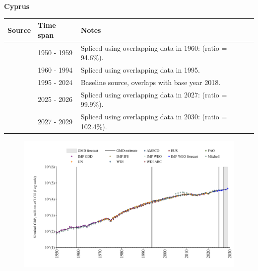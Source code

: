\documentclass[12pt,a4paper,landscape]{article}
\begin{document}
\begin{adjustbox}{max totalsize={\paperwidth}{\paperheight},center}
\begin{minipage}[t][\textheight][t]{\textwidth}
\vspace*{0.5cm}
{}
\begin{center}
{\Large\bfseries Cyprus}
\end{center}
\vspace{0.5cm}
\begin{table}[H]
\centering
\small
\begin{tabular}{|l|l|l|}
\hline
\textbf{Source} & \textbf{Time span} & \textbf{Notes} \\
\hline
\rowcolor{white}\cite{IMF_GDD}& 1950 - 1959 &Spliced using overlapping data in 1960: (ratio = 94.6\%).\\
\rowcolor{lightgray}\cite{AMECO}& 1960 - 1994 &Spliced using overlapping data in 1995.\\
\rowcolor{white}\cite{EUS}& 1995 - 2024 &Baseline source, overlaps with base year 2018.\\
\rowcolor{lightgray}\cite{AMECO}& 2025 - 2026 &Spliced using overlapping data in 2027: (ratio = 99.9\%).\\
\rowcolor{white}\cite{IMF_WEO_forecast}& 2027 - 2029 &Spliced using overlapping data in 2030: (ratio = 102.4\%).\\
\hline
\end{tabular}
\end{table}
\begin{figure}[H]
\centering
\includegraphics[width=\textwidth,height=0.6\textheight,keepaspectratio]{graphs/CYP_nGDP.pdf}
\end{figure}
\end{minipage}
\end{adjustbox}
\end{document}
